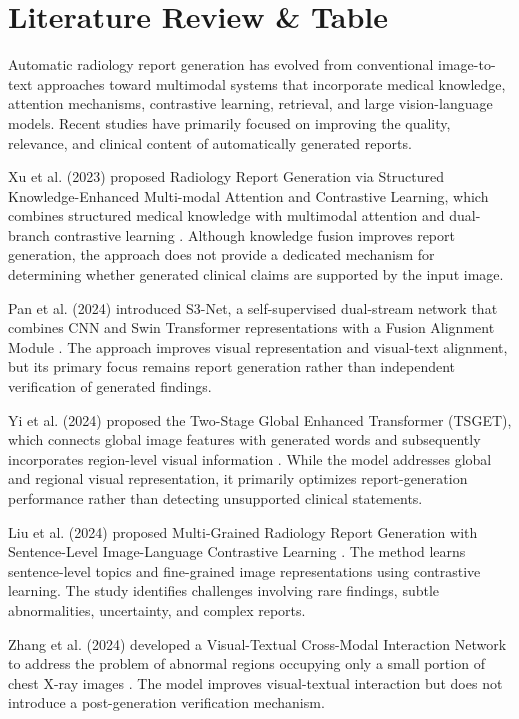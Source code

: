 \documentclass[12pt,a4paper]{report}
\begin{document}
\chapter{Literature Review \& Table}

Automatic radiology report generation has evolved from conventional image-to-text approaches toward multimodal systems that incorporate medical knowledge, attention mechanisms, contrastive learning, retrieval, and large vision-language models. Recent studies have primarily focused on improving the quality, relevance, and clinical content of automatically generated reports.

Xu et al. (2023) proposed Radiology Report Generation via Structured Knowledge-Enhanced Multi-modal Attention and Contrastive Learning, which combines structured medical knowledge with multimodal attention and dual-branch contrastive learning \cite{xu2023radiology}. Although knowledge fusion improves report generation, the approach does not provide a dedicated mechanism for determining whether generated clinical claims are supported by the input image.

Pan et al. (2024) introduced S3-Net, a self-supervised dual-stream network that combines CNN and Swin Transformer representations with a Fusion Alignment Module \cite{pan2024s3}. The approach improves visual representation and visual-text alignment, but its primary focus remains report generation rather than independent verification of generated findings.

Yi et al. (2024) proposed the Two-Stage Global Enhanced Transformer (TSGET), which connects global image features with generated words and subsequently incorporates region-level visual information \cite{yi2024tsget}. While the model addresses global and regional visual representation, it primarily optimizes report-generation performance rather than detecting unsupported clinical statements.

Liu et al. (2024) proposed Multi-Grained Radiology Report Generation with Sentence-Level Image-Language Contrastive Learning \cite{liu2024multi}. The method learns sentence-level topics and fine-grained image representations using contrastive learning. The study identifies challenges involving rare findings, subtle abnormalities, uncertainty, and complex reports.

Zhang et al. (2024) developed a Visual-Textual Cross-Modal Interaction Network to address the problem of abnormal regions occupying only a small portion of chest X-ray images \cite{zhang2024visual}. The model improves visual-textual interaction but does not introduce a post-generation verification mechanism.
\end{document}
